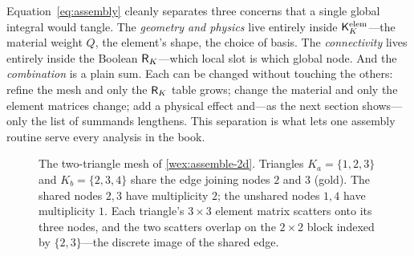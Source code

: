 Equation~\cref{eq:assembly} cleanly separates three concerns that a single global
integral would tangle. The \emph{geometry and physics} live entirely inside
$\mathsf{K}^{\mathrm{elem}}_K$---the material weight $Q$, the element's shape, the
choice of basis. The \emph{connectivity} lives entirely inside the Boolean
$\mathsf{R}_K$---which local slot is which global node. And the \emph{combination}
is a plain sum. Each can be changed without touching the others: refine the mesh
and only the $\mathsf{R}_K$ table grows; change the material and only the element
matrices change; add a physical effect and---as the next section shows---only the
list of summands lengthens. This separation is what lets one assembly routine
serve every analysis in the book.

\begin{figure}[t]
\centering
{}
\caption[Two triangles sharing an edge]{The two-triangle mesh of
\cref{wex:assemble-2d}. Triangles $K_a=\{1,2,3\}$ and $K_b=\{2,3,4\}$ share the
edge joining nodes $2$ and $3$ (gold). The shared nodes $2,3$ have multiplicity
$2$; the unshared nodes $1,4$ have multiplicity $1$. Each triangle's $3\times3$
element matrix scatters onto its three nodes, and the two scatters overlap on the
$2\times2$ block indexed by $\{2,3\}$---the discrete image of the shared edge.}
\label{fig:twotri}
\end{figure}

